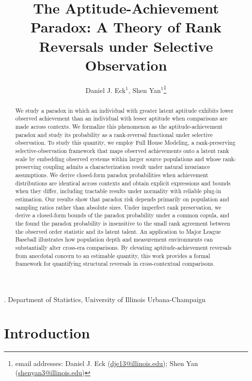 \documentclass[12pt]{article}
\title{The Aptitude-Achievement Paradox: A Theory of Rank Reversals under Selective Observation}
\author{Daniel J. Eck$^1$, Shen Yan$^1$\thanks{email addresses: Daniel J. Eck (\url{dje13@illinois.edu});  Shen Yan (\url{shenyan3@illinois.edu})}}
\date{}
\begin{document}
\maketitle

{. Department of Statistics, University of Illinois Urbana-Champaign \\}

\begin{abstract}
We study a paradox in which an individual with greater latent aptitude exhibits lower observed achievement than an individual with lesser aptitude when comparisons are made across contexts. We formalize this phenomenon as the aptitude-achievement paradox and study its probability as a rank-reversal functional under selective observation. To study this quantity, we employ Full House Modeling, a rank-preserving selective-observation framework that maps observed achievements onto a latent rank scale by embedding observed systems within larger source populations and whose rank-preserving coupling admits a characterization result under natural invariance assumptions. We derive closed-form paradox probabilities when achievement distributions are identical across contexts and obtain explicit expressions and bounds when they differ, including tractable results under normality with reliable plug-in estimation. Our results show that paradox risk depends primarily on population and sampling ratios rather than absolute sizes. Under imperfect rank preservation, we derive a closed-form bounds of the paradox probability under a common copula, and the found the paradox probability is insensitive to the small rank agreement between the observed order statistic and its latent talent. An application to Major League Baseball illustrates how population depth and measurement environments can substantially alter cross-era comparisons. By elevating aptitude-achievement reversals from anecdotal concern to an estimable quantity, this work provides a formal framework for quantifying structural reversals in cross-contextual comparisons.
\end{abstract}



\section{Introduction}
\end{document}
